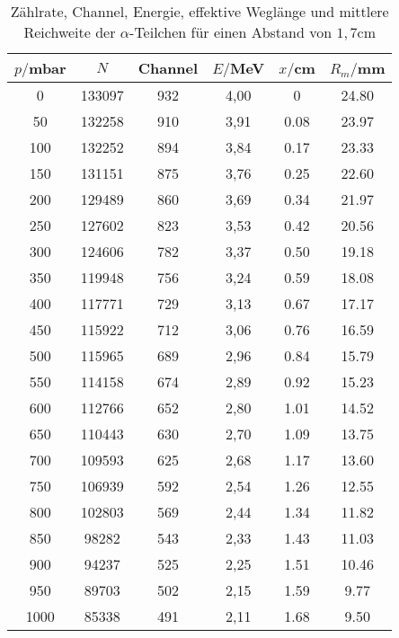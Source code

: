 \begin{table}[H]
  \centering
  \caption{Zählrate, Channel, Energie, effektive Weglänge und mittlere Reichweite der $\alpha$-Teilchen für einen Abstand von $1,7$cm}
  \label{tab:Spannungsamplitude}
  \begin{tabular}{c c c c c c}
    \toprule
    $p/$mbar & $N$ & Channel & $E/$MeV & $x/$cm & $R_m/$mm \\
    \midrule
    0	  & 133097  & 932 &   4,00 & 0    & 24.80       \\
    50	& 132258  & 910 &   3,91 & 0.08 & 23.97      \\
    100 & 132252  & 894 &   3,84 & 0.17 & 23.33       \\
    150 & 131151  & 875 &   3,76 & 0.25 & 22.60       \\
    200 & 129489  & 860 &   3,69 & 0.34 & 21.97       \\
    250 & 127602  & 823 &   3,53 & 0.42 & 20.56       \\
    300 & 124606  & 782 &   3,37 & 0.50 & 19.18       \\
    350 & 119948  & 756 &   3,24 & 0.59 & 18.08       \\
    400 & 117771  & 729 &   3,13 & 0.67 & 17.17       \\
    450 & 115922  & 712 &   3,06 & 0.76 & 16.59       \\
    500 & 115965  & 689 &   2,96 & 0.84 & 15.79       \\
    550 & 114158  & 674 &   2,89 & 0.92 & 15.23       \\
    600 & 112766  & 652 &   2,80 & 1.01 & 14.52       \\
    650 & 110443  & 630 &   2,70 & 1.09 & 13.75       \\
    700 & 109593  & 625 &   2,68 & 1.17 & 13.60       \\
    750 & 106939  & 592 &   2,54 & 1.26 & 12.55      \\
    800 & 102803  & 569 &   2,44 & 1.34 & 11.82      \\
    850 & 98282	  & 543 &   2,33 & 1.43 & 11.03      \\
    900 & 94237	  & 525 &   2,25 & 1.51 & 10.46   \\
    950 & 89703	  & 502 &   2,15 & 1.59 & 9.77     \\
    1000& 85338   & 491 &   2,11 & 1.68 & 9.50    \\
    \bottomrule
  \end{tabular}
\end{table}





